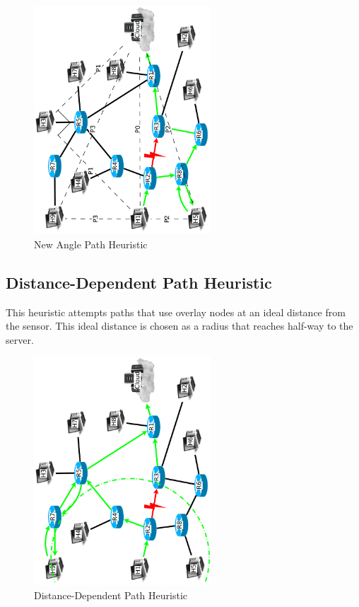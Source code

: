 \documentclass[conference]{IEEEtran}
\begin{document}
\begin{figure}
\centering
\includegraphics[width=2.6in,angle=-90]{../../images/diagrams/new_angle}
\caption{New Angle Path Heuristic}
\end{figure}

%
\subsection{Distance-Dependent Path Heuristic}
This heuristic attempts paths that use overlay nodes at an ideal distance from the sensor.  This ideal distance is chosen as a radius that reaches half-way to the server.
\begin{algorithm}
\DontPrintSemicolon
{}
\SetAlgoLined
\SetAlgoLongEnd
\scriptsize
\caption{}
\small
\end{algorithm}

\begin{figure}
\centering
\includegraphics[width=2.6in,angle=-90]{../../images/diagrams/ideal_distant_path}
\caption{Distance-Dependent Path Heuristic}
\end{figure}
%
\end{document}
